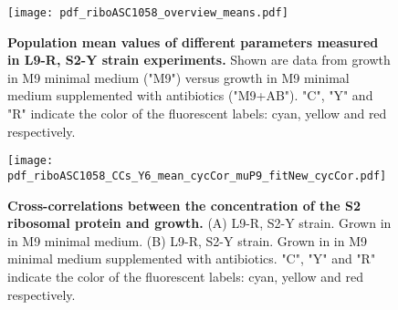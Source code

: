 \begin{figure}
    \centering
    \texttt{[image: pdf\_riboASC1058\_overview\_means.pdf]}
    \caption{ 
        \textbf{Population mean values of different parameters measured in L9-R, S2-Y strain experiments.}
        Shown are data from growth in M9 minimal medium ("M9") versus growth in M9 minimal medium supplemented with antibiotics ("M9+AB").
        "C", "Y" and "R" indicate the color of the fluorescent labels: cyan, yellow and red respectively.
    }
    \label{fig:ribo:meansRR}
\end{figure}


\begin{figure}
    \centering
    \texttt{[image: pdf\_riboASC1058\_CCs\_Y6\_mean\_cycCor\_muP9\_fitNew\_cycCor.pdf]}
    \caption{ 
        \textbf{Cross-correlations between the concentration of the S2 ribosomal protein and growth.}
        (A) L9-R, S2-Y strain. Grown in in M9 minimal medium.
        (B) L9-R, S2-Y strain. Grown in in M9 minimal medium supplemented with antibiotics. 
        "C", "Y" and "R" indicate the color of the fluorescent labels: cyan, yellow and red respectively.
    }
    \label{fig:ribo:CCsEmuS2}
\end{figure}

